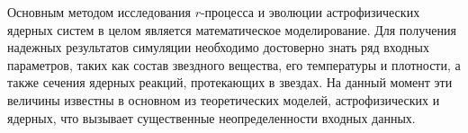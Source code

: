 Основным методом исследования $r$-процесса и эволюции астрофизических ядерных систем в целом является математическое моделирование. Для получения надежных результатов симуляции необходимо достоверно знать ряд входных параметров, таких как состав звездного вещества, его температуры и плотности, а также сечения ядерных реакций, протекающих в звездах. На данный момент эти величины известны в основном из теоретических моделей, астрофизических и ядерных, что вызывает существенные неопределенности входных данных.



